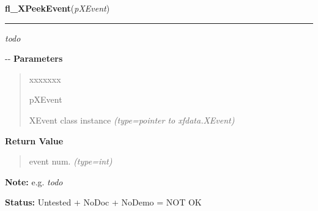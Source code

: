 \hspace{.8\funcindent}\begin{boxedminipage}{\funcwidth}

    \raggedright \textbf{fl\_XPeekEvent}(\textit{pXEvent})

    \vspace{-1.5ex}

    \rule{\textwidth}{0.5\fboxrule}
\setlength{\parskip}{2ex}

\emph{todo}

-{}-
\setlength{\parskip}{1ex}
      \textbf{Parameters}
      \vspace{-1ex}

      \begin{quote}
        \begin{Ventry}{xxxxxxx}

          \item[pXEvent]


XEvent class instance
            {\it (type=pointer to xfdata.XEvent)}

        \end{Ventry}

      \end{quote}

      \textbf{Return Value}
    \vspace{-1ex}

      \begin{quote}

event num.
      {\it (type=int)}

      \end{quote}

\textbf{Note:} 
e.g. \emph{todo}


\textbf{Status:} 
Untested + NoDoc + NoDemo = NOT OK


    \end{boxedminipage}

    \label{xformslib:flxbasic:fl_XEventsQueued}

    \vspace{0.5ex}

